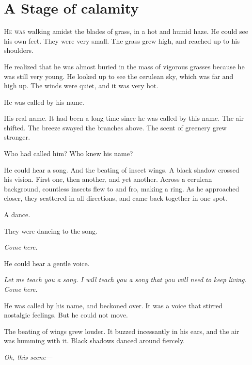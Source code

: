 
\chapter{A Stage of calamity}


\lettrine{H}{e was} walking amidst the blades of grass, in a hot and humid haze. He
could see his own feet. They were very small. The grass grew high, and
reached up to his shoulders.

He realized that he was almost buried in the mass of vigorous grasses
because he was still very young. He looked up to see the cerulean sky,
which was far and high up. The winds were quiet, and it was very hot.~

He was called by his name.

His real name. It had been a long time since he was called by this name.
The air shifted. The breeze swayed the branches above. The scent of
greenery grew stronger.

Who had called him? Who knew his name?

He could hear a song. And the beating of insect wings. A black shadow
crossed his vision. First one, then another, and yet another. Across a
cerulean background, countless insects flew to and fro, making a ring.
As he approached closer, they scattered in all directions, and came back
together in one spot.

A dance.

They were dancing to the song.

\emph{Come here.}

He could hear a gentle voice.

\emph{Let me teach you a song. I will teach you a song that you will need to
keep living. Come here.}

He was called by his name, and beckoned over. It was a voice that
stirred nostalgic feelings. But he could not move.

The beating of wings grew louder. It buzzed incessantly in his ears, and
the air was humming with it. Black shadows danced around fiercely.

\emph{Oh, this scene―}

